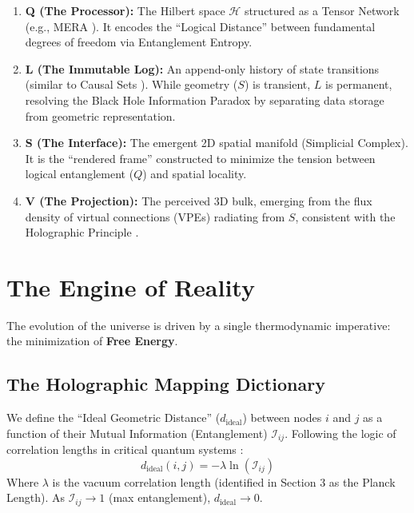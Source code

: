 \documentclass[11pt, a4paper]{article}
\begin{document}
\begin{enumerate}
    \item \textbf{Q (The Processor):} The Hilbert space $\mathcal{H}$ structured as a Tensor Network (e.g., MERA \cite{swingle2012}). It encodes the ``Logical Distance'' between fundamental degrees of freedom via Entanglement Entropy.
    \item \textbf{L (The Immutable Log):} An append-only history of state transitions (similar to Causal Sets \cite{sorkin2003}). While geometry ($S$) is transient, $L$ is permanent, resolving the Black Hole Information Paradox \cite{page1993} by separating data storage from geometric representation.
    \item \textbf{S (The Interface):} The emergent 2D spatial manifold (Simplicial Complex). It is the ``rendered frame'' constructed to minimize the tension between logical entanglement ($Q$) and spatial locality.
    \item \textbf{V (The Projection):} The perceived 3D bulk, emerging from the flux density of virtual connections (VPEs) radiating from $S$, consistent with the Holographic Principle \cite{maldacena1999}.
\end{enumerate}

\section{The Engine of Reality}

The evolution of the universe is driven by a single thermodynamic imperative: the minimization of \textbf{Free Energy}.

\subsection{The Holographic Mapping Dictionary}
We define the ``Ideal Geometric Distance'' ($d_{\text{ideal}}$) between nodes $i$ and $j$ as a function of their Mutual Information (Entanglement) $\mathcal{I}_{ij}$. Following the logic of correlation lengths in critical quantum systems \cite{ryu2006}:
\begin{equation}
    d_{\text{ideal}}(i,j) = -\lambda \ln(\mathcal{I}_{ij})
\end{equation}
Where $\lambda$ is the vacuum correlation length (identified in Section 3 as the Planck Length). As $\mathcal{I}_{ij} \to 1$ (max entanglement), $d_{\text{ideal}} \to 0$.
\end{document}
